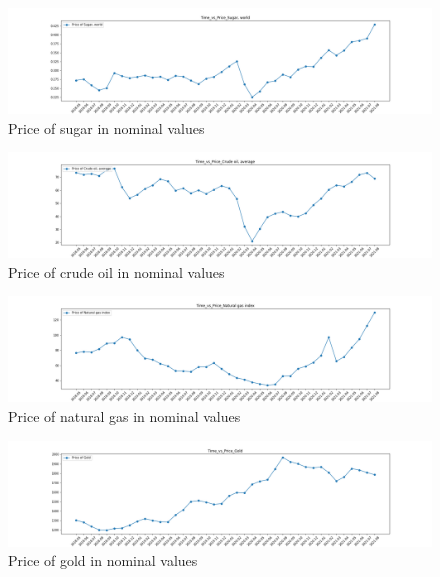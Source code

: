 \documentclass{scrartcl}
\begin{document}
\begin{figure} [H]
	\begin{center}
		\includegraphics[scale=0.3]{Graphics/Time_vs_Price_Sugar, world.png}
	\end{center}
	\caption{Price of sugar in nominal values}
	\label{fig:log-archi}
\end{figure}
\begin{figure} [H]
	\begin{center}
		\includegraphics[scale=0.3]{Graphics/Time_vs_Price_Crude oil, average.png}
	\end{center}
	\caption{Price of crude oil in nominal values}
	\label{fig:log-archi}
\end{figure}
\begin{figure} [H]
	\begin{center}
		\includegraphics[scale=0.3]{Graphics/Time_vs_Price_Natural gas index.png}
	\end{center}
	\caption{Price of natural gas in nominal values}
	\label{fig:log-archi}
\end{figure}
\begin{figure} [H]
	\begin{center}
		\includegraphics[scale=0.3]{Graphics/Time_vs_Price_Gold.png}
	\end{center}
	\caption{Price of gold in nominal values}
	\label{fig:log-archi}
\end{figure}
\end{document}
